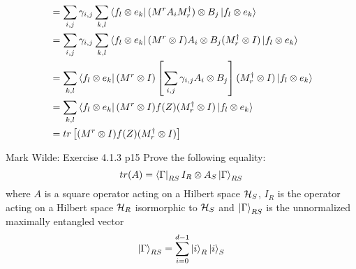 \documentclass[a4paper, 11pt]{article}
\begin{document}
{\begin{enumerate}
\begin{align*}
		& = \sum_{i,j}\gamma_{i,j}\sum_{k,l}\bra{f_l\otimes e_k}(M^r A_iM_r^{\dagger})\otimes B_j\ket{f_l\otimes e_k}\\
		& = \sum_{i,j}\gamma_{i,j}\sum_{k,l}\bra{f_l\otimes e_k}(M^r\otimes I) A_i\otimes B_j(M_r^{\dagger}\otimes I)\ket{f_l\otimes e_k}\\
		& = \sum_{k,l}\bra{f_l\otimes e_k}(M^r\otimes I)\left[\sum_{i,j}\gamma_{i,j} A_i\otimes B_j\right](M_r^{\dagger}\otimes I)\ket{f_l\otimes e_k}\\
		& = \sum_{k,l}\bra{f_l\otimes e_k}(M^r\otimes I)f(Z)(M_r^{\dagger}\otimes I)\ket{f_l\otimes e_k}\\
		& = tr\left[ (M^r\otimes I)f(Z)(M_r^{\dagger}\otimes I) \right]
		\end{align*}
\end{enumerate}
}


\begin{problem}{%
		Mark Wilde: Exercise 4.1.3
	}{p15%
	}
	 Prove the following equality:$$tr(A)=\bra{\Gamma}_{RS}I_R\otimes A_S\ket{\Gamma}_{RS}$$where $A$ is a square operator acting on a Hilbert space $\mathcal{H}_S$, $I_R$  is the operator acting on a Hilbert space $\mathcal{H}_R$ isormorphic to $\mathcal{H}_S$ and $\ket{\Gamma}_{RS}$ is the unnormalized  maximally entangled  vector $$\ket{\Gamma}_{RS}=\sum_{i=0}^{d-1}\ket{i}_R\ket{i}_S$$
\end{problem}

\end{document}
